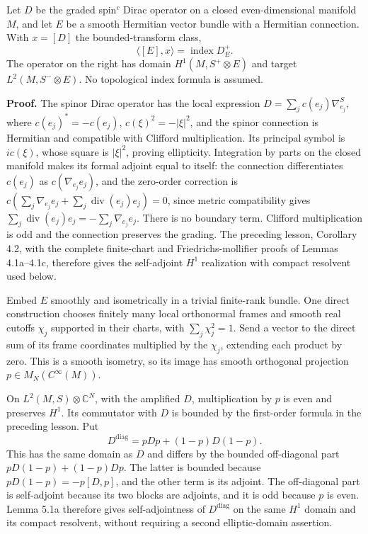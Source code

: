 \documentclass[
  11pt,
]{article}
\begin{document}
Let \(D\) be the graded spin\(^{c}\) Dirac operator on a closed
even-dimensional manifold \(M\), and let \(E\) be a smooth Hermitian
vector bundle with a Hermitian connection. With \(x=[D]\) the
bounded-transform class, \[
\langle[E],x\rangle=\operatorname{index}D_E^+.
\tag{5.1}
\] The operator on the right has domain \(H^1(M,S^+\otimes E)\) and
target \(L^2(M,S^-\otimes E)\). No topological index formula is assumed.

\textbf{Proof.} The spinor Dirac operator has the local expression
\(D=\sum_j c(e_j)\nabla^S_{e_j}\), where \(c(e_j)^*=-c(e_j)\),
\(c(\xi)^2=-|\xi|^2\), and the spinor connection is Hermitian and
compatible with Clifford multiplication. Its principal symbol is
\(ic(\xi)\), whose square is \(|\xi|^2\), proving ellipticity.
Integration by parts on the closed manifold makes its formal adjoint
equal to itself: the connection differentiates \(c(e_j)\) as
\(c(\nabla_{e_j}e_j)\), and the zero-order correction is
\(c(\sum_j\nabla_{e_j}e_j+\sum_j\operatorname{div}(e_j)e_j)=0\), since
metric compatibility gives
\(\sum_j\operatorname{div}(e_j)e_j=-\sum_j\nabla_{e_j}e_j\). There is no
boundary term. Clifford multiplication is odd and the connection
preserves the grading. The preceding lesson, Corollary 4.2, with the
complete finite-chart and Friedrichs-mollifier proofs of Lemmas
4.1a--4.1c, therefore gives the self-adjoint \(H^1\) realization with
compact resolvent used below.

Embed \(E\) smoothly and isometrically in a trivial finite-rank bundle.
One direct construction chooses finitely many local orthonormal frames
and smooth real cutoffs \(\chi_j\) supported in their charts, with
\(\sum_j\chi_j^2=1\). Send a vector to the direct sum of its frame
coordinates multiplied by the \(\chi_j\), extending each product by
zero. This is a smooth isometry, so its image has smooth orthogonal
projection \(p\in M_N(C^\infty(M))\).

On \(L^2(M,S)\otimes\mathbb C^N\), with the amplified \(D\),
multiplication by \(p\) is even and preserves \(H^1\). Its commutator
with \(D\) is bounded by the first-order formula in the preceding
lesson. Put \[
D^\mathrm{diag}=pDp+(1-p)D(1-p).
\] This has the same domain as \(D\) and differs by the bounded
off-diagonal part \(pD(1-p)+(1-p)Dp\). The latter is bounded because
\(pD(1-p)=-p[D,p]\), and the other term is its adjoint. The off-diagonal
part is self-adjoint because its two blocks are adjoints, and it is odd
because \(p\) is even. Lemma 5.1a therefore gives self-adjointness of
\(D^{\mathrm{diag}}\) on the same \(H^1\) domain and its compact
resolvent, without requiring a second elliptic-domain assertion.
\end{document}
